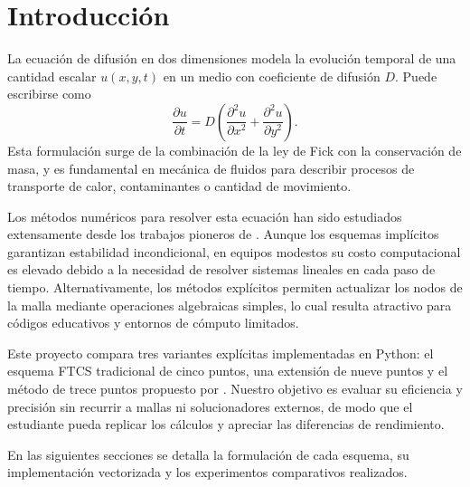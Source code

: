 \section{Introducci\'on}
La ecuaci\'on de difusi\'on en dos dimensiones modela la evoluci\'on temporal de una cantidad escalar $u(x,y,t)$ en un medio con coeficiente de difusi\'on $D$.  Puede escribirse como
\begin{equation}
    \frac{\partial u}{\partial t}=D\left(\frac{\partial^2 u}{\partial x^2}+\frac{\partial^2 u}{\partial y^2}\right).
\end{equation}
Esta formulaci\'on surge de la combinaci\'on de la ley de Fick con la conservaci\'on de masa, y es fundamental en mec\'anica de fluidos para describir procesos de transporte de calor, contaminantes o cantidad de movimiento.

Los m\'etodos num\'ericos para resolver esta ecuaci\'on han sido estudiados extensamente desde los trabajos pioneros de \citet{crank1975}.  Aunque los esquemas impl\'icitos garantizan estabilidad incondicional, en equipos modestos su costo computacional es elevado debido a la necesidad de resolver sistemas lineales en cada paso de tiempo.  Alternativamente, los m\'etodos expl\'icitos permiten actualizar los nodos de la malla mediante operaciones algebraicas simples, lo cual resulta atractivo para c\'odigos educativos y entornos de c\'omputo limitados.

Este proyecto compara tres variantes expl\'icitas implementadas en Python: el esquema FTCS tradicional de cinco puntos, una extensi\'on de nueve puntos y el m\'etodo de trece puntos propuesto por \citet{dehghan2002}.  Nuestro objetivo es evaluar su eficiencia y precisi\'on sin recurrir a mallas ni solucionadores externos, de modo que el estudiante pueda replicar los c\'alculos y apreciar las diferencias de rendimiento.

En las siguientes secciones se detalla la formulaci\'on de cada esquema, su implementaci\'on vectorizada y los experimentos comparativos realizados.

